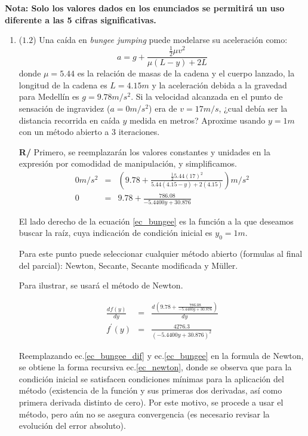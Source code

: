 \documentclass[12pt]{article}
\newcommand{\diff}[3]{\frac{d^{#3} #1}{d#2^{#3}}}
\begin{document}
\textbf{Nota: Solo los valores dados en los enunciados se permitirá un uso diferente a las 5 cifras significativas.}
\vspace{-.5cm}
  \begin{enumerate}[leftmargin=*,widest=9]
  
     \item (\(1.2\)) Una caída en \textit{bungee jumping} puede modelarse su aceleración como:
\begin{equation*}
a = g + \frac{\frac{1}{2}\mu v^2}{\mu (L-y) + 2L}
\end{equation*}
donde \(\mu=5.44\) es la relación de masas de la cadena y el cuerpo lanzado, la longitud de la cadena es \(L = 4.15m\) y la aceleración debida a la gravedad para Medellín es \(g=9.78m/s^2\). Si la velocidad alcanzada en el punto de sensación de ingravidez (\(a=0m/s^2\)) era de \(v=17m/s\), ¿cual debía ser la distancia recorrida en caída \(y\) medida en metros? Aproxime usando \(y=1m\) con un método abierto a 3 iteraciones.

\textbf{R/} Primero, se reemplazarán los valores constantes y unidades en la expresión por comodidad de manipulación, y simplificamos.
\begin{eqnarray}
0 m/s^2 & = & \left( 9.78 + \frac{\frac{1}{2}5.44 (17)^2}{5.44 (4.15-y) + 2(4.15)} \right) m/s^2 \nonumber \\
0 & = & 9.78 + \frac{786.08}{- 5.4400 y + 30.876} \label{ec_bungee}
\end{eqnarray}

El lado derecho de la ecuación \ref{ec_bungee} es la función a la que deseamos buscar la raíz, cuya indicación de condición inicial es \(y_0=1m\).

Para este punto puede seleccionar cualquier método abierto (formulas al final del parcial): Newton, Secante, Secante modificada y M\"uller.

Para ilustrar, se usará el método de Newton.

\begin{eqnarray}
\diff{f(y)}{y}{} & = & \diff{ \left(9.78 + \frac{786.08}{- 5.4400 y + 30.876} \right) }{y}{} \nonumber \\
f^{\prime}(y) & = & \frac{4276.3}{\left(- 5.4400 y + 30.876\right)^{2}} \label{ec_bungee_dif}
\end{eqnarray}

Reemplazando ec.\ref{ec_bungee_dif} y ec.\ref{ec_bungee} en la formula de Newton, se obtiene la forma recursiva ec.\ref{ec_newton}, donde se observa que para la condición inicial se satisfacen condiciones mínimas para la aplicación del método (existencia de la función y sus primeras dos derivadas, así como primera derivada distinto de cero). Por este motivo, se procede a usar el método, pero aún no se asegura convergencia (es necesario revisar la evolución del error absoluto).


\end{enumerate}
\end{document}
